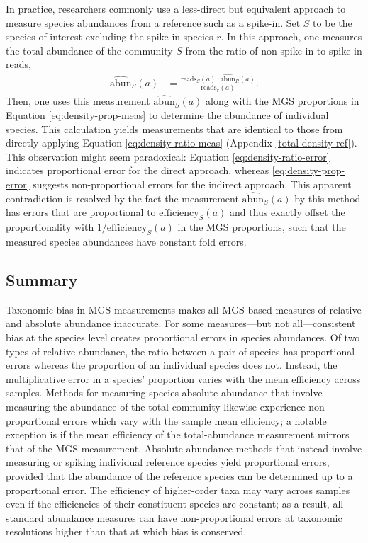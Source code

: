 \documentclass[
]{article}
\begin{document}
In practice, researchers commonly use a less-direct but equivalent approach to measure species abundances from a reference such as a spike-in.
Set \(S\) to be the species of interest excluding the spike-in species \(r\).
In this approach, one measures the total abundance of the community \(S\) from the ratio of non-spike-in to spike-in reads,
\begin{align}
  \label{eq:total-density-spike}
  \widehat{\text{abun}}_S(a) 
  &= \frac{\text{reads}_S(a) \cdot \widehat{\text{abun}}_R(a)}{\text{reads}_r(a)}.
\end{align}
Then, one uses this measurement \(\widehat{\text{abun}}_{S}(a)\) along with the MGS proportions in Equation \eqref{eq:density-prop-meas} to determine the abundance of individual species.
This calculation yields measurements that are identical to those from directly applying Equation \eqref{eq:density-ratio-meas} (Appendix \ref{total-density-ref}).
This observation might seem paradoxical: Equation \eqref{eq:density-ratio-error} indicates proportional error for the direct approach, whereas \eqref{eq:density-prop-error} suggests non-proportional errors for the indirect approach.
This apparent contradiction is resolved by the fact the measurement \(\widehat{\text{abun}}_{S}(a)\) by this method has errors that are proportional to \(\text{efficiency}_S(a)\) and thus exactly offset the proportionality with \(1/\text{efficiency}_S(a)\) in the MGS proportions, such that the measured species abundances have constant fold errors.

\hypertarget{summary}{%
\subsection{Summary}\label{summary}}

Taxonomic bias in MGS measurements makes all MGS-based measures of relative and absolute abundance inaccurate.
For some measures---but not all---consistent bias at the species level creates proportional errors in species abundances.
Of two types of relative abundance, the ratio between a pair of species has proportional errors whereas the proportion of an individual species does not.
Instead, the multiplicative error in a species' proportion varies with the mean efficiency across samples.
Methods for measuring species absolute abundance that involve measuring the abundance of the total community likewise experience non-proportional errors which vary with the sample mean efficiency;
a notable exception is if the mean efficiency of the total-abundance measurement mirrors that of the MGS measurement.
Absolute-abundance methods that instead involve measuring or spiking individual reference species yield proportional errors, provided that the abundance of the reference species can be determined up to a proportional error.
The efficiency of higher-order taxa may vary across samples even if the efficiencies of their constituent species are constant; as a result, all standard abundance measures can have non-proportional errors at taxonomic resolutions higher than that at which bias is conserved.
\end{document}
